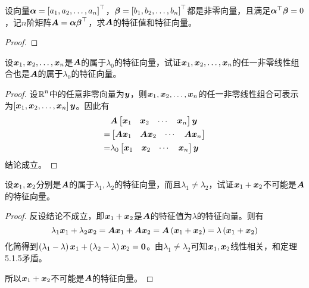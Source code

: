 \begin{problem}
设向量\(\vecal=\myvec{\enums{a}{n}}\)，\(\vecbeta=\myvec{\enums{b}{n}}\)都是非零向量，且满足\(\vecal^\top\vecbeta=0\)，记\(n\)阶矩阵\(\mata=\vecal\vecbeta^\top\)，求\(\mata\)的特征值和特征向量。
\end{problem}
\begin{proof}
\end{proof}

\begin{problem}
设\(\enums{\vecx}{n}\)是\(\mata\)的属于\(\lambda_0\)的特征向量，试证\(\enums{\vecx}{n}\)的任一非零线性组合也是\(\mata\)的属于\(\lambda_0\)的特征向量。
\end{problem}
\begin{proof}
    设\(\rea^n\)中的任意非零向量为\(\vecy\)，则\(\enums{\vecx}{n}\)的任一非零线性组合可表示为\(\mat{\enums{\vecx}{n}}\vecy\)。因此有
    \begin{align*}
          & \mata\begin{bmatrix}\vecx_1&\vecx_2&\cdots&\vecx_n\end{bmatrix}\vecy      \\
        = & \begin{bmatrix}\mata\vecx_1&\mata\vecx_2&\cdots&\mata\vecx_n\end{bmatrix} \\
        = & \lambda_0\begin{bmatrix}\vecx_1&\vecx_2&\cdots&\vecx_n\end{bmatrix}\vecy
    \end{align*}
    结论成立。
\end{proof}

\begin{problem}
设\(\vecx_1,\vecx_2\)分别是\(\mata\)的属于\(\lambda_1,\lambda_2\)的特征向量，而且\(\lambda_1\neq\lambda_2\)，试证\(\vecx_1+\vecx_2\)不可能是\(\mata\)的特征向量。
\end{problem}
\begin{proof}
    反设结论不成立，即\(\vecx_1+\vecx_2\)是\(\mata\)的特征值为\(\lambda\)的特征向量。则有
    \begin{equation*}
        \lambda_1\vecx_1+\lambda_2\vecx_2=\mata\vecx_1+\mata\vecx_2=\mata\spar{\vecx_1+\vecx_2}=\lambda\spar{\vecx_1+\vecx_2}
    \end{equation*}
    化简得到\(\spar{\lambda_1-\lambda}\vecx_1+\spar{\lambda_2-\lambda}\vecx_2=\veczero\)。由\(\lambda_1\neq\lambda_2\)可知\(\vecx_1,\vecx_2\)线性相关，和定理5.1.5矛盾。

    所以\(\vecx_1+\vecx_2\)不可能是\(\mata\)的特征向量。
\end{proof}

